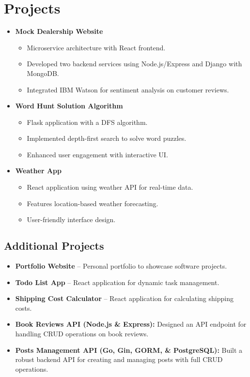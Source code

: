 \documentclass[11pt,a4paper,sans]{moderncv}
\begin{document}
\section{Projects}
\begin{itemize}
    \item \textbf{Mock Dealership Website}
    \begin{itemize}
        \item Microservice architecture with React frontend.
        \item Developed two backend services using Node.js/Express and Django with MongoDB.
        \item Integrated IBM Watson for sentiment analysis on customer reviews.
    \end{itemize}
    \item \textbf{Word Hunt Solution Algorithm}
    \begin{itemize}
        \item Flask application with a DFS algorithm.
        \item Implemented depth-first search to solve word puzzles.
        \item Enhanced user engagement with interactive UI.
    \end{itemize}
    \item \textbf{Weather App}
    \begin{itemize}
        \item React application using weather API for real-time data.
        \item Features location-based weather forecasting.
        \item User-friendly interface design.
    \end{itemize}
\end{itemize}

\subsection{Additional Projects}
\begin{itemize}
    \item \textbf{Portfolio Website} -- Personal portfolio to showcase software projects.
    \item \textbf{Todo List App} -- React application for dynamic task management.
    \item \textbf{Shipping Cost Calculator} -- React application for calculating shipping costs.
    \item \textbf{Book Reviews API (Node.js \& Express):} Designed an API endpoint for handling CRUD operations on book reviews.
    \item \textbf{Posts Management API (Go, Gin, GORM, \& PostgreSQL):} Built a robust backend API for creating and managing posts with full CRUD operations.
\end{itemize}
\end{document}
